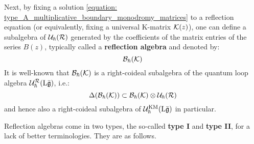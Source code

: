         Next, by fixing a solution \eqref{equation: type_A_multiplicative_boundary_monodromy_matrices} to a reflection equation (or equivalently, fixing a universal K-matrix $\mathcal{K}(z)$), one can define a subalgebra of $\mathcal{U}_{\hbar}(\mathcal{R})$ generated by the coefficients of the matrix entries of the series $B(z)$, typically called a \textbf{reflection algebra} and denoted by:
            $$\mathcal{B}_{\hbar}(\mathcal{K})$$
        It is well-known that $\mathcal{B}_{\hbar}(\mathcal{K})$ is a right-coideal subalgebra of the quantum loop algebra $\mathcal{U}_{\hbar}^{\mathcal{R}}(\mathrm{L} \bar{\mathfrak{g}})$, i.e.:
            $$\Delta( \calB_{\hbar}(\calK) ) \subset \calB_{\hbar}(\calK) \tensor \calU_{\hbar}(\calR)$$
        and hence also a right-coideal subalgebra of $\mathcal{U}_{\hbar}^{\mathrm{KM}}(\mathrm{L} \bar{\mathfrak{g}})$ in particular.
            
        Reflection algebras come in two types, the so-called \textbf{type I} and \textbf{type II}, for a lack of better terminologies. They are as follows.

